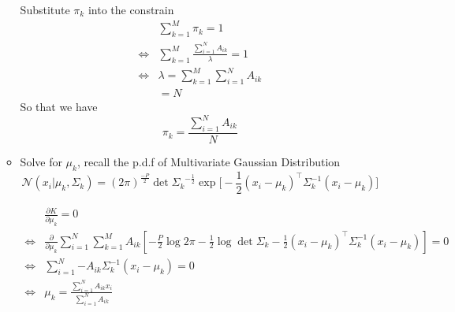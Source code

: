 \begin{itemize}
\begin{itemize}
				Substitute $\pi_k$ into the constrain
					\begin{equation}
						\begin{aligned}
							& \sum_{k=1}^M {\pi_k} = 1 \\
							\iff & \sum_{k=1}^M{
								\frac{\sum_{i=1}^N{A_{ik}}}{\lambda}
							} = 1 \\
							\iff & \lambda = \sum_{k=1}^M \sum_{i=1}^N A_{ik} \\
								& = N 
						\end{aligned}
					\end{equation}
				So that we have 
				\begin{equation}
					\pi_k = \frac{\sum_{i=1}^N{A_{ik}}}{N}
				\end{equation}
			\item Solve for $\mu_k$, recall the p.d.f of Multivariate Gaussian Distribution
				$$
				\mathcal{N}(x_i | \mu_k, \Sigma_k) = (2\pi)^\frac{-P}{2} 
					\det{\Sigma_k}^{-\frac{1}{2}} 
					\exp \bigg [
						-\frac{1}{2}(x_i -\mu_k)^\top\Sigma_k^{-1} (x_i - \mu_k)
					\bigg ]
				$$ 
				
				\begin{equation}
					\begin{aligned}
						& \frac{\partial K}{\partial \mu_k} = 0 \\
						\iff &  
						\frac{\partial}{\partial \mu_k} {
							\sum_{i=1}^N {
								\sum_{k=1}^M {
									A_{ik} [
										-\frac{P}{2}\log{2\pi} -\frac{1}{2} \log \det \Sigma_k - \frac{1}{2} (x_i - \mu_k)^\top\Sigma_k^{-1}(x_i - \mu_k)
									]
								}
							}
						} = 0 \\
						\iff & 
							\sum_{i=1}^N{
								-A_{ik} \Sigma_k^{-1} (x_i - \mu_k)
							} = 0 \\
						\iff &
							\mu_k = \frac{
								\sum_{i=1}^{N}{
									A_{ik} x_i
								}
							}{
								\sum_{i=1}^{N}{
									A_{ik}				}
							}
					\end{aligned}
				\end{equation}
			

\end{itemize}
\end{itemize}
